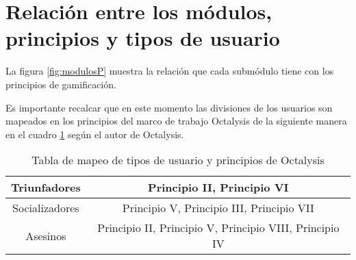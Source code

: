 



\section{Relación entre los módulos, principios y tipos de usuario}
\label{analisis:principios}
    
    La figura \ref{fig:modulosP} muestra la relación que cada submódulo tiene con los principios de gamificación.
    

    Es importante recalcar que en este momento las divisiones de los usuarios son mapeados 
    en los principios del marco de trabajo Octalysis de la siguiente manera en el cuadro
    \ref{table:usuariosvprincipios} según el autor de Octalysis\cite[p. 414]{Octalysis}.
    
    \begin{table}[h!]
    \centering
    \begin{tabular}{|c|c|} \hline
        Triunfadores & Principio II, Principio VI \\ \hline
        Socializadores &  Principio V, Principio III, Principio VII\\\hline
        Asesinos & Principio II, Principio V, Principio VIII, Principio IV \\\hline
    \end{tabular}
    \caption{Tabla de mapeo de tipos de usuario y principios de Octalysis}
    \label{table:usuariosvprincipios}
    \end{table}
